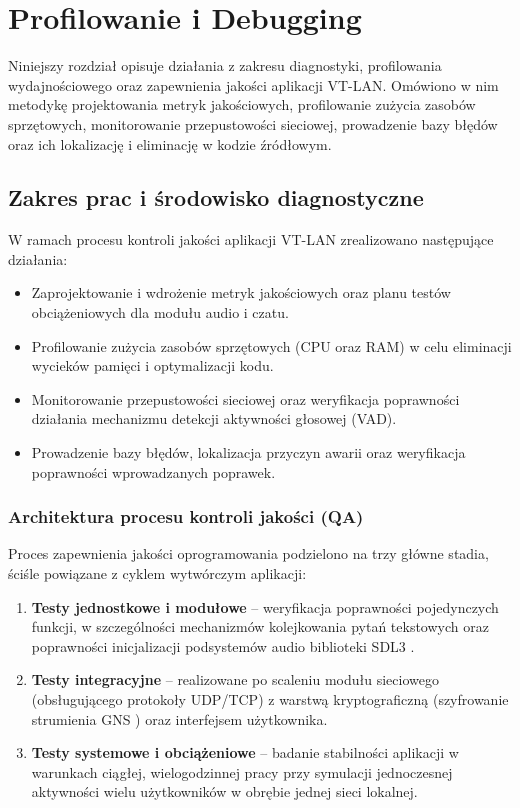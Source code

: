 
\chapter{Profilowanie i Debugging}
\label{ch:profilowanie_debugging}

Niniejszy rozdział opisuje działania z zakresu diagnostyki, profilowania
wydajnościowego oraz zapewnienia jakości aplikacji VT-LAN. Omówiono
w nim metodykę projektowania metryk jakościowych, profilowanie zużycia
zasobów sprzętowych, monitorowanie przepustowości sieciowej, prowadzenie
bazy błędów oraz ich lokalizację i eliminację w kodzie źródłowym.

\section{Zakres prac i środowisko diagnostyczne}
\label{sec:db_zakres}

W ramach procesu kontroli jakości aplikacji VT-LAN zrealizowano
następujące działania:
\begin{itemize}
	\item Zaprojektowanie i wdrożenie metryk jakościowych oraz planu
	testów obciążeniowych dla modułu audio i czatu.
	\item Profilowanie zużycia zasobów sprzętowych (CPU oraz RAM)
	w celu eliminacji wycieków pamięci i optymalizacji kodu.
	\item Monitorowanie przepustowości sieciowej oraz weryfikacja
	poprawności działania mechanizmu detekcji aktywności
	głosowej (VAD).
	\item Prowadzenie bazy błędów, lokalizacja przyczyn awarii
	oraz weryfikacja poprawności wprowadzanych poprawek.
\end{itemize}

\subsection{Architektura procesu kontroli jakości (QA)}
\label{subsec:db_qa}

Proces zapewnienia jakości oprogramowania podzielono na trzy główne stadia,
ściśle powiązane z cyklem wytwórczym aplikacji:

\begin{enumerate}
	\item \textbf{Testy jednostkowe i modułowe} -- weryfikacja poprawności
	pojedynczych funkcji, w szczególności mechanizmów kolejkowania pytań
	tekstowych oraz poprawności inicjalizacji podsystemów audio biblioteki
	SDL3 \cite{SDL3}.
	\item \textbf{Testy integracyjne} -- realizowane po scaleniu modułu sieciowego
	(obsługującego protokoły UDP/TCP) z warstwą kryptograficzną (szyfrowanie
	strumienia GNS \cite{GNS}) oraz interfejsem użytkownika.
	\item \textbf{Testy systemowe i obciążeniowe} -- badanie stabilności aplikacji
	w warunkach ciągłej, wielogodzinnej pracy przy symulacji jednoczesnej
	aktywności wielu użytkowników w obrębie jednej sieci lokalnej.
\end{enumerate}

